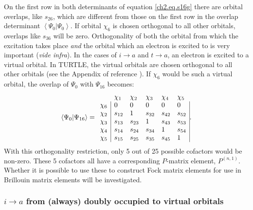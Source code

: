 On the first row in both determinants of equation \ref{ch2.eq.s16g} there are orbital overlaps, like $s_{26}$, which are different from those on the first row in the overlap determinant $\left< \Psi_0 | \Psi_0 \right>$. If orbital $\chi_6$ is chosen orthogonal to all other orbitals, overlaps like $s_{36}$ will be zero. Orthogonality of both the orbital from which the excitation takes place \textit{and} the orbital which an electron is excited to is very important (\textit{vide infra}). In the cases of $i \rightarrow a$ and $t \rightarrow a$, an electron is excited to a virtual orbital. In TURTLE, the virtual orbitals are chosen orthogonal to all other orbitals (see the Appendix of reference \cite{koos1}). If $\chi_6$ would be such a virtual orbital, the overlap of $\Psi_0$ with $\Psi_{16}$ becomes:
\begin{equation}
\left < \Psi_0 | \Psi_{16} \right> =
\begin{array}{llllll}
 &  \chi_1 & \chi_2 & \chi_3 & \chi_4 & \chi_5 \\
 \chi_6 & \multicolumn{1}{|l}{ 0 } & 0 & 0 & 0 & \multicolumn{1}{l|}{ 0 } \\
 \chi_2 & \multicolumn{1}{|l}{ s_{12} } & 1 & s_{32} & s_{42} & \multicolumn{1}{l|}{ s_{52} } \\
 \chi_3 & \multicolumn{1}{|l}{ s_{13} } & s_{23} & 1 & s_{43} & \multicolumn{1}{l|}{ s_{53} } \\
 \chi_4 & \multicolumn{1}{|l}{ s_{14} } & s_{24} & s_{34} & 1 & \multicolumn{1}{l|}{ s_{54} } \\
 \chi_5 & \multicolumn{1}{|l}{ s_{15} } & s_{25} & s_{35} & s_{45} & \multicolumn{1}{l|}{ 1 }
\end{array}.
\label{ch2.eq.s016go}
\end{equation}
With this orthogonality restriction, only 5 out of 25 possible cofactors would be non-zero. These 5 cofactors all have a corresponding $P$-matrix element, $P^{(n,1)}$. Whether it is possible to use these to construct Fock matrix elements for use in Brillouin matrix elements will be investigated.

\subsubsection{\label{ch2.sec.i-a}$i \rightarrow a$ from (always) doubly occupied to virtual orbitals}


